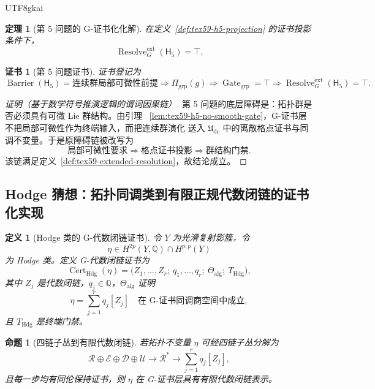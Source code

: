\documentclass[12pt]{article}
\newtheorem{definition}{定义}[section]
\newtheorem{theorem}{定理}[section]
\newtheorem{proposition}{命题}[section]
\newtheorem{Certificate}{证书}[section]
\newcommand{\QQ}{\mathbb{Q}}
\newcommand{\Udc}{\mathfrak{U}_{\mathrm{dc}}}
\newcommand{\Rstar}{\mathcal{R}^{\ast}}
\newcommand{\Rcal}{\mathcal{R}}
\newcommand{\Ecal}{\mathcal{E}}
\newcommand{\Dcal}{\mathcal{D}}
\newcommand{\Ucal}{\mathcal{U}}
\DeclareMathOperator{\Cert}{Cert}
\DeclareMathOperator{\Resolve}{Resolve}
\DeclareMathOperator{\Barrier}{Barrier}
\DeclareMathOperator{\Gate}{Gate}
\begin{document}
\begin{CJK*}{UTF8}{gkai}
\begin{theorem}[第 5 问题的 G-证书化化解]
\label{thm:tex59-h5-resolution}
在定义~\ref{def:tex59-h5-projection} 的证书投影条件下，
\[
  \Resolve_G^{\mathrm{ext}}(\mathsf H_5)=\top.
\]
\end{theorem}

\begin{Certificate}[第 5 问题证书]
\label{cert:tex59-h5-resolution}
证书登记为
\[
  \Barrier(\mathsf H_5)
  =
  \text{连续群局部可微性前提}
  \Longrightarrow
  \Pi_{\mathrm{grp}}(g)
  \Longrightarrow
  \Gate_{\mathrm{grp}}=\top
  \Longrightarrow
  \Resolve_G^{\mathrm{ext}}(\mathsf H_5)=\top.
\]
\end{Certificate}

\begin{proof}[证明（基于数学符号推演逻辑的谓词因果链）]
第 5 问题的底层障碍是：拓扑群是否必须具有可微 Lie 群结构。由引理
~\ref{lem:tex59-h5-no-smooth-gate}，G-证书层不把局部可微性作为终端输入，而把连续群演化
送入 \(\Udc\) 中的离散格点证书与同调不变量。于是原障碍链被改写为
\[
  \text{局部可微性要求}
  \Longrightarrow
  \text{格点证书投影}
  \Longrightarrow
  \text{群结构门禁}.
\]
该链满足定义~\ref{def:tex59-extended-resolution}，故结论成立。
\end{proof}

\subsection{Hodge 猜想：拓扑同调类到有限正规代数闭链的证书化实现}
\label{subsec:tex59-hodge}

\begin{definition}[Hodge 类的 G-代数闭链证书]
\label{def:tex59-hodge-certificate}
令 \(Y\) 为光滑复射影簇，令
\[
  \eta\in H^{2p}(Y,\QQ)\cap H^{p,p}(Y)
\]
为 Hodge 类。定义 G-代数闭链证书为
\[
  \Cert_{\mathrm{Hdg}}(\eta)
  =
  \bigl(
    Z_1,\ldots,Z_r;\ q_1,\ldots,q_r;\ \Theta_{\mathrm{alg}};\ T_{\mathrm{Hdg}}
  \bigr),
\]
其中 \(Z_j\) 是代数闭链，\(q_j\in\QQ\)，\(\Theta_{\mathrm{alg}}\) 证明
\[
  \eta
  =
  \sum_{j=1}^r q_j[Z_j]
  \quad\text{在 G-证书同调商空间中成立},
\]
且 \(T_{\mathrm{Hdg}}\) 是终端门禁。
\end{definition}

\begin{proposition}[四链子丛到有限代数闭链]
\label{prop:tex59-hodge-four-chain}
若拓扑不变量 \(\eta\) 可经四链子丛分解为
\[
  \Rcal\oplus\Ecal\oplus\Dcal\oplus\Ucal
  \longrightarrow
  \Rstar
  \longrightarrow
  \sum_{j=1}^r q_j[Z_j],
\]
且每一步均有同伦保持证书，则 \(\eta\) 在 G-证书层具有有限代数闭链表示。
\end{proposition}


\end{CJK*}
\end{document}
